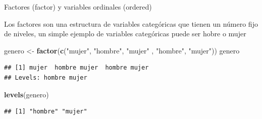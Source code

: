 \documentclass[ignorenonframetext,]{beamer}
\newenvironment{Shaded}{\begin{snugshade}}{\end{snugshade}}
\newcommand{\KeywordTok}[1]{\textcolor[rgb]{0.13,0.29,0.53}{\textbf{#1}}}
\newcommand{\StringTok}[1]{\textcolor[rgb]{0.31,0.60,0.02}{#1}}
\newcommand{\NormalTok}[1]{#1}
\begin{document}
\begin{frame}[fragile]{Factores (factor) y variables ordinales
(ordered)}

Los factores son una estructura de variables categóricas que tienen un
número fijo de niveles, un simple ejemplo de variables categóricas puede
ser hobre o mujer

\begin{Shaded}
\begin{Highlighting}[]
\NormalTok{genero <-}\StringTok{ }\KeywordTok{factor}\NormalTok{(}\KeywordTok{c}\NormalTok{(}\StringTok{"mujer"}\NormalTok{, }\StringTok{"hombre"}\NormalTok{, }\StringTok{"mujer"}
\NormalTok{                   , }\StringTok{"hombre"}\NormalTok{, }\StringTok{"mujer"}\NormalTok{))}
\NormalTok{genero}
\end{Highlighting}
\end{Shaded}

\begin{verbatim}
## [1] mujer  hombre mujer  hombre mujer 
## Levels: hombre mujer
\end{verbatim}

\begin{Shaded}
\begin{Highlighting}[]
\KeywordTok{levels}\NormalTok{(genero)}
\end{Highlighting}
\end{Shaded}

\begin{verbatim}
## [1] "hombre" "mujer"
\end{verbatim}

\end{frame}
\end{document}
